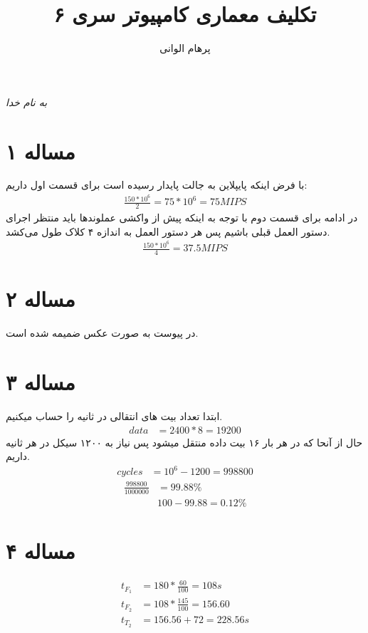 \documentclass[11pt]{article}
\author{پرهام الوانی}
\title{تکلیف معماری کامپیوتر سری ۶}
\begin{document}
\begin{titlepage}
\begin{center}
\emph{به نام خدا}
\end{center}
\maketitle
\begin{center}
\end{center}
\end{titlepage}
\tableofcontents
\newpage
\section{مساله ۱}
با فرض اینکه پایپلاین به جالت پایدار رسیده است برای قسمت اول داریم:
\begin{align*}
	\frac{150 * 10^6}{2} = 75 * 10^6 = 75 MIPS
\end{align*}
در ادامه برای قسمت دوم با توجه به اینکه پیش از واکشی عملوند‌‌ها باید منتظر اجرای دستور العمل قبلی باشیم پس 
هر دستور العمل به اندازه ۴ کلاک طول می‌کشد.
\begin{align*}
	\frac{150 * 10^6}{4} = 37.5 MIPS 
\end{align*}
\section{مساله ۲}
در پیوست به صورت عکس ضمیمه شده است.
\section{مساله ۳}
ابتدا تعداد بیت های انتقالی در ثانیه را حساب میکنیم.
\begin{align*}
	data &= 2400 * 8 = 19200
\end{align*}
حال از آنحا که در هر بار ۱۶ بیت داده منتقل میشود پس نیاز به ۱۲۰۰ سیکل در هر ثانیه داریم.
\begin{align*}
	cycles &= 10^6 - 1200 = 998800
\end{align*}
\begin{align*}
	\frac{998800}{1000000} &= 99.88\% \\
	& 100 - 99.88 = 0.12\%
\end{align*}
\section{مساله ۴}
\begin{align*}
	t_{F_{1}} &= 180 * \frac{60}{100} = 108s \\
	t_{F_{2}} &= 108 * \frac{145}{100} = 156.60 \\
	t_{T_{2}} &= 156.56 + 72 = 228.56s
\end{align*}
\end{document}

